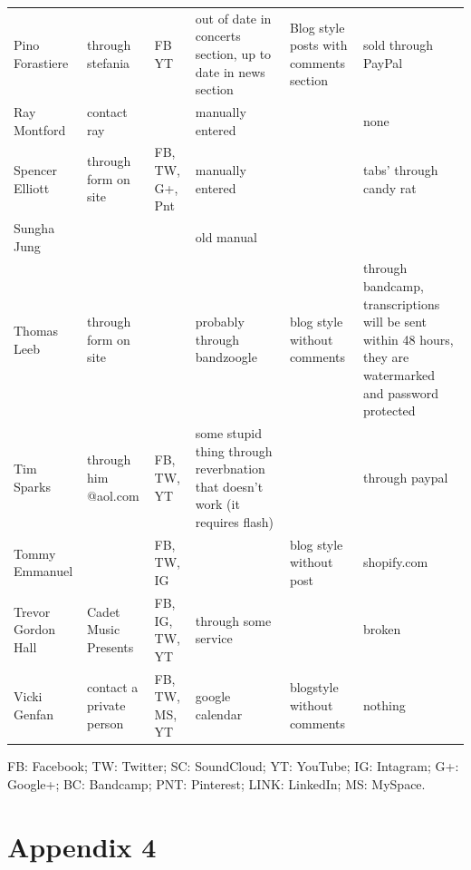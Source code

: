 \documentclass[unicode,hyperfootnotes=false,xetex,colorlinks=true,nofonts,nobib]{tufte-handout}
\begin{document}
\begin{longtable}{p{} p{} p{} p{} p{} p{}}
  Pino Forastiere & through stefania & FB YT  & out of date in concerts section, up to date in news section & Blog style posts with comments section & sold through PayPal\\
  Ray Montford & contact ray &  & manually entered &  & none\\
  Spencer Elliott & through form on site & FB, TW, G+, Pnt & manually entered &  & tabs’ through candy rat\\
  Sungha Jung &  &  & old manual &  & \\
  Thomas Leeb & through form on site &  & probably through bandzoogle & blog style without comments & through bandcamp, transcriptions will be sent within 48 hours, they are watermarked and password protected\\
  Tim Sparks & through him @aol.com & FB, TW, YT & some stupid thing through reverbnation that doesn’t work (it requires flash) &  & through paypal\\
  Tommy Emmanuel &  & FB, TW, IG &  & blog style without post & shopify.com\\
  Trevor Gordon Hall & Cadet Music Presents & FB, IG, TW, YT & through some service &  & broken\\
  Vicki Genfan & contact a private person & FB, TW, MS, YT & google calendar & blogstyle without comments & nothing\\
  
\end{longtable}
FB: Facebook; TW: Twitter; SC: SoundCloud; YT: YouTube; IG: Intagram; G+: Google+; BC: Bandcamp; PNT: Pinterest; LINK: LinkedIn; MS: MySpace.\\

\clearpage
\section{Appendix 4}
\label{sec:appendix-4}
\end{document}
